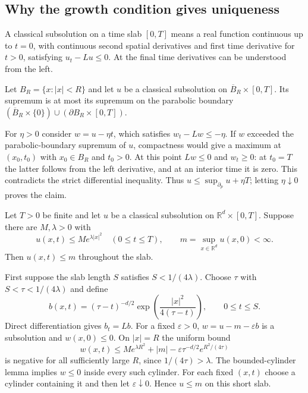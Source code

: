 \subsection{Why the growth condition gives uniqueness}
A classical subsolution on a time slab $[0,T]$ means a real function
continuous up to $t=0$, with continuous second spatial derivatives
and first time derivative for $t>0$, satisfying $u_t-Lu\leq0$.
At the final time derivatives can be understood from the left.

\begin{lemma}
\label{lem:heat_cylinder_maximum}
Let $B_R=\{x:|x|<R\}$ and let $u$ be a classical subsolution on
$\overline B_R\times[0,T]$. Its supremum is at most its supremum
on the parabolic boundary
$(\overline B_R\times\{0\})\cup(\partial B_R\times[0,T])$.
\end{lemma}
\Proof
For $\eta>0$ consider $w=u-\eta t$, which satisfies
$w_t-Lw\leq-\eta$. If $w$ exceeded the parabolic-boundary supremum
of $u$, compactness would give a maximum at $(x_0,t_0)$ with
$x_0\in B_R$ and $t_0>0$. At this point $Lw\leq0$ and
$w_t\geq0$: at $t_0=T$ the latter follows from the left derivative,
and at an interior time it is zero. This contradicts the strict
differential inequality. Thus $u\leq\sup_{\partial_p}u+\eta T$;
letting $\eta\downarrow0$ proves the claim.
\Done

\begin{theorem}
\label{thm:heat_gaussian_growth_maximum}
Let $T>0$ be finite and let $u$ be a classical subsolution on
$\mathbb R^d\times[0,T]$. Suppose there are $M,\lambda>0$ with
\[
u(x,t)\leq M e^{\lambda|x|^2}\quad(0\leq t\leq T),
\qquad m=\sup_{x\in\mathbb R^d}u(x,0)<\infty.
\]
Then $u(x,t)\leq m$ throughout the slab.
\end{theorem}
\Proof
First suppose the slab length $S$ satisfies $S<1/(4\lambda)$.
Choose $\tau$ with $S<\tau<1/(4\lambda)$ and define
\[
b(x,t)=(\tau-t)^{-d/2}
       \exp\left(\frac{|x|^2}{4(\tau-t)}\right),\qquad0\leq t\leq S.
\]
Direct differentiation gives $b_t=Lb$. For a fixed $\varepsilon>0$,
$w=u-m-\varepsilon b$ is a subsolution and $w(x,0)\leq0$.
On $|x|=R$ the uniform bound
\[
w(x,t)\leq M e^{\lambda R^2}+|m|
 -\varepsilon\tau^{-d/2}e^{R^2/(4\tau)}
\]
is negative for all sufficiently large $R$, since
$1/(4\tau)>\lambda$. The bounded-cylinder lemma implies $w\leq0$
inside every such cylinder. For each fixed $(x,t)$ choose a cylinder
containing it and then let $\varepsilon\downarrow0$. Hence $u\leq m$
on this short slab.

